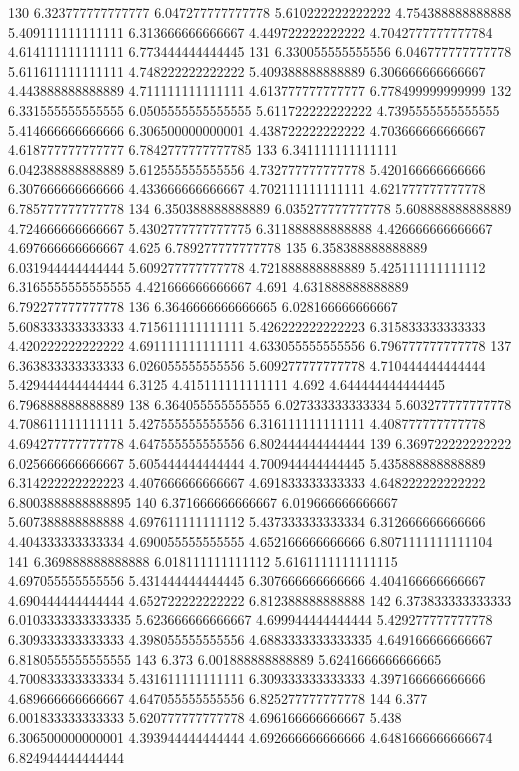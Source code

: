 130 6.323777777777777 6.047277777777778 5.610222222222222 4.754388888888888 5.409111111111111 6.313666666666667 4.449722222222222 4.7042777777777784 4.614111111111111 6.773444444444445
131 6.330055555555556 6.046777777777778 5.611611111111111 4.748222222222222 5.409388888888889 6.306666666666667 4.443888888888889 4.711111111111111 4.613777777777777 6.778499999999999
132 6.331555555555555 6.0505555555555555 5.611722222222222 4.7395555555555555 5.414666666666666 6.306500000000001 4.438722222222222 4.703666666666667 4.618777777777777 6.7842777777777785
133 6.341111111111111 6.042388888888889 5.612555555555556 4.732777777777778 5.420166666666666 6.307666666666666 4.433666666666667 4.702111111111111 4.621777777777778 6.785777777777778
134 6.350388888888889 6.035277777777778 5.608888888888889 4.724666666666667 5.4302777777777775 6.311888888888888 4.426666666666667 4.697666666666667 4.625 6.789277777777778
135 6.358388888888889 6.031944444444444 5.609277777777778 4.721888888888889 5.425111111111112 6.3165555555555555 4.421666666666667 4.691 4.631888888888889 6.792277777777778
136 6.3646666666666665 6.028166666666667 5.608333333333333 4.715611111111111 5.426222222222223 6.315833333333333 4.420222222222222 4.691111111111111 4.633055555555556 6.796777777777778
137 6.363833333333333 6.026055555555556 5.609277777777778 4.710444444444444 5.429444444444444 6.3125 4.415111111111111 4.692 4.644444444444445 6.796888888888889
138 6.364055555555555 6.027333333333334 5.603277777777778 4.708611111111111 5.427555555555556 6.316111111111111 4.408777777777778 4.694277777777778 4.647555555555556 6.802444444444444
139 6.369722222222222 6.025666666666667 5.605444444444444 4.700944444444445 5.435888888888889 6.314222222222223 4.407666666666667 4.691833333333333 4.648222222222222 6.8003888888888895
140 6.371666666666667 6.019666666666667 5.607388888888888 4.697611111111112 5.437333333333334 6.312666666666666 4.404333333333334 4.690055555555555 4.652166666666666 6.8071111111111104
141 6.369888888888888 6.018111111111112 5.6161111111111115 4.697055555555556 5.431444444444445 6.307666666666666 4.404166666666667 4.690444444444444 4.652722222222222 6.812388888888888
142 6.373833333333333 6.0103333333333335 5.623666666666667 4.699944444444444 5.429277777777778 6.309333333333333 4.398055555555556 4.6883333333333335 4.649166666666667 6.8180555555555555
143 6.373 6.001888888888889 5.6241666666666665 4.700833333333334 5.431611111111111 6.309333333333333 4.397166666666666 4.689666666666667 4.647055555555556 6.825277777777778
144 6.377 6.001833333333333 5.620777777777778 4.696166666666667 5.438 6.306500000000001 4.393944444444444 4.692666666666666 4.6481666666666674 6.824944444444444
